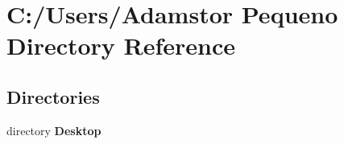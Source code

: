 \section{C\+:/\+Users/\+Adamstor Pequeno Directory Reference}
\label{dir_a8becdc49c1803a1138a58ca40bd45e6}
\subsection*{Directories}
\begin{DoxyCompactItemize}
\item 
directory \textbf{ Desktop}
\end{DoxyCompactItemize}
